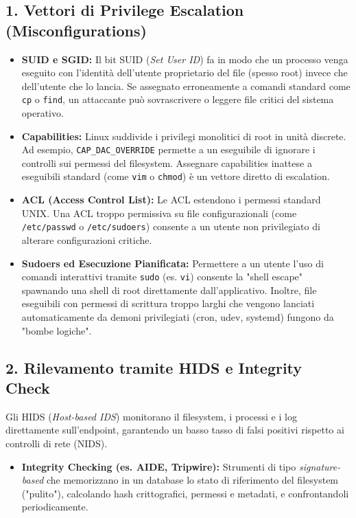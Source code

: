 \documentclass[12pt, a4paper]{report}
\begin{document}
\subsection{1. Vettori di Privilege Escalation (Misconfigurations)}
\begin{itemize}
	\item \textbf{SUID e SGID:} Il bit SUID (\textit{Set User ID}) fa in modo che un processo venga eseguito con l'identità dell'utente proprietario del file (spesso root) invece che dell'utente che lo lancia. Se assegnato erroneamente a comandi standard come \texttt{cp} o \texttt{find}, un attaccante può sovrascrivere o leggere file critici del sistema operativo.
	\item \textbf{Capabilities:} Linux suddivide i privilegi monolitici di root in unità discrete. Ad esempio, \texttt{CAP\_DAC\_OVERRIDE} permette a un eseguibile di ignorare i controlli sui permessi del filesystem. Assegnare capabilities inattese a eseguibili standard (come \texttt{vim} o \texttt{chmod}) è un vettore diretto di escalation.
	\item \textbf{ACL (Access Control List):} Le ACL estendono i permessi standard UNIX. Una ACL troppo permissiva su file configurazionali (come \texttt{/etc/passwd} o \texttt{/etc/sudoers}) consente a un utente non privilegiato di alterare configurazioni critiche.
	\item \textbf{Sudoers ed Esecuzione Pianificata:} Permettere a un utente l'uso di comandi interattivi tramite \texttt{sudo} (es. \texttt{vi}) consente la "shell escape" spawnando una shell di root direttamente dall'applicativo. Inoltre, file eseguibili con permessi di scrittura troppo larghi che vengono lanciati automaticamente da demoni privilegiati (cron, udev, systemd) fungono da "bombe logiche".
\end{itemize}

\subsection{2. Rilevamento tramite HIDS e Integrity Check}
Gli HIDS (\textit{Host-based IDS}) monitorano il filesystem, i processi e i log direttamente sull'endpoint, garantendo un basso tasso di falsi positivi rispetto ai controlli di rete (NIDS).
\begin{itemize}
	\item \textbf{Integrity Checking (es. AIDE, Tripwire):} Strumenti di tipo \textit{signature-based} che memorizzano in un database lo stato di riferimento del filesystem ("pulito"), calcolando hash crittografici, permessi e metadati, e confrontandoli periodicamente.
\end{itemize}
\end{document}
